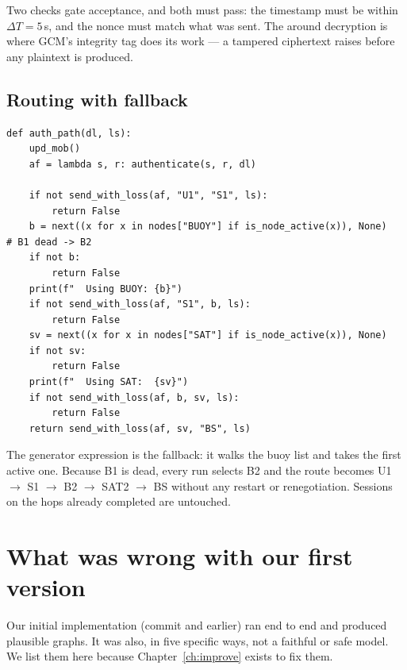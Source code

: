 Two checks gate acceptance, and both must pass: the timestamp must be within $\Delta T = 5$\,s,
and the nonce must match what was sent. The  around decryption is where
GCM's integrity tag does its work --- a tampered ciphertext raises before any plaintext is
produced.

\subsection{Routing with fallback}

\begin{lstlisting}[style=py,caption={Path selection with automatic fallback (lines 199--217).}]
def auth_path(dl, ls):
    upd_mob()
    af = lambda s, r: authenticate(s, r, dl)

    if not send_with_loss(af, "U1", "S1", ls):
        return False
    b = next((x for x in nodes["BUOY"] if is_node_active(x)), None)   # B1 dead -> B2
    if not b:
        return False
    print(f"  Using BUOY: {b}")
    if not send_with_loss(af, "S1", b, ls):
        return False
    sv = next((x for x in nodes["SAT"] if is_node_active(x)), None)
    if not sv:
        return False
    print(f"  Using SAT:  {sv}")
    if not send_with_loss(af, b, sv, ls):
        return False
    return send_with_loss(af, sv, "BS", ls)
\end{lstlisting}

The  generator expression is the fallback: it walks the buoy list and takes
the first active one. Because B1 is dead, every run selects B2 and the route becomes
U1 $\to$ S1 $\to$ B2 $\to$ SAT2 $\to$ BS without any restart or renegotiation. Sessions on
the hops already completed are untouched.

\section{What was wrong with our first version}
\label{sec:firstversion}

Our initial implementation (commit  and earlier) ran end to end and produced
plausible graphs. It was also, in five specific ways, not a faithful or safe model. We list
them here because Chapter~\ref{ch:improve} exists to fix them.

